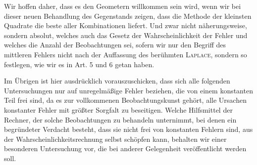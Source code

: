 Wir hoffen daher, dass es den Geometern willkommen sein wird, wenn wir bei dieser neuen Behandlung des Gegenstands zeigen, dass die Methode der kleinsten Quadrate die beste aller Kombinationen liefert. Und zwar nicht näherungsweise, sondern absolut, welches auch das Gesetz der Wahrscheinlichkeit der Fehler und welches die Anzahl der Beobachtungen sei, sofern wir nur den Begriff des mittleren Fehlers nicht nach der Auffassung des berühmten \textsc{Laplace}, sondern so festlegen, wie wir es in Art. 5 und 6 getan haben.

Im Übrigen ist hier ausdrücklich vorauszuschicken, dass sich alle folgenden Untersuchungen nur auf unregelmäßige Fehler beziehen, die von einem konstanten Teil frei sind, da es zur vollkommenen Beobachtungskunst gehört, alle Ursachen konstanter Fehler mit größter Sorgfalt zu beseitigen. Welche Hilfsmittel der Rechner, der solche Beobachtungen zu behandeln unternimmt, bei denen ein begründeter Verdacht besteht, dass sie nicht frei von konstanten Fehlern sind, aus der Wahrscheinlichkeitsrechnung selbst schöpfen kann, behalten wir einer besonderen Untersuchung vor, die bei anderer Gelegenheit veröffentlicht werden soll.

\clearpage
